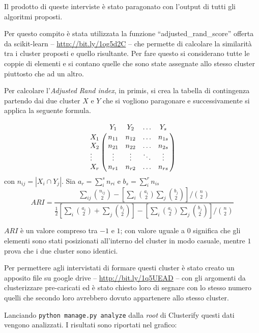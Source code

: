 Il prodotto di queste interviste è stato paragonato con l'output di tutti gli algoritmi proposti. 

Per questo compito è stata utilizzata la funzione ``adjusted\_rand\_score'' offerta da scikit-learn -- \url{http://bit.ly/1og5d2C} -- che permette di calcolare la similarità tra i cluster proposti e quello risultante. Per fare questo si considerano tutte le coppie di elementi e si contano quelle che sono state assegnate allo stesso cluster piuttosto che ad un altro.

Per calcolare  l'\emph{Adjusted Rand index}, in primis, si crea la tabella di contingenza partendo dai due cluster $X$ e $Y$ che si vogliono paragonare e successivamente si applica la seguente formula.

\begin{equation*}
	\bordermatrix{
                 ~ & Y_1 & Y_2 & \ldots & Y_s \cr
                 X_1 & n_{11} & n_{12} & \ldots & n_{1s} \cr
                 X_2 & n_{21} & n_{22} & \ldots & n_{2s} \cr
                 \vdots & \vdots & \vdots & \ddots & \vdots \cr
                X_r & n_{r1} & n_{r2} & \ldots & n_{rs}	
        }
\end{equation*}
con $n_{ij}=|X_i \cap Y_j|$. Sia $a_r = \sum_{i}^{s}{n_{ri}}$ e  $b_s = \sum_{i}^{r}{n_{is}}$
\begin{equation*}
	ARI = \frac{ \sum_{ij} \binom{n_{ij}}{2} - [\sum_i \binom{a_i}{2} \sum_j \binom{b_j}{2}] / \binom{n}{2} }{ \frac{1}{2} [\sum_i \binom{a_i}{2} + \sum_j \binom{b_j}{2}] - [\sum_i \binom{a_i}{2} \sum_j \binom{b_j}{2}] / \binom{n}{2} }
\end{equation*}

$ARI$ è un valore compreso tra $-1$ e $1$; con valore uguale a $0$ significa che gli elementi sono stati posizionati all'interno del cluster in modo casuale, mentre $1$ prova che i due cluster sono identici.

Per permettere agli intervistati di formare questi cluster è stato creato un apposito file su google drive -- \url{http://bit.ly/1q5UEAD} -- con gli argomenti da clusterizzare pre-caricati ed è stato chiesto loro di segnare con lo stesso numero quelli che secondo loro avrebbero dovuto appartenere allo stesso cluster. 

Lanciando \texttt{python manage.py analyze} dalla \emph{root} di Clusterify questi dati vengono analizzati. I risultati sono riportati nel grafico:

